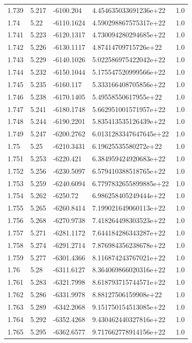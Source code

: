 \begin{tabular}{lllll}
1.739 & 5.217 & -6100.204 & 4.454635033691236e+22 & 1.0 \\
1.74 & 5.22 & -6110.1624 & 4.590298867575317e+22 & 1.0 \\
1.741 & 5.223 & -6120.1317 & 4.730094280294685e+22 & 1.0 \\
1.742 & 5.226 & -6130.1117 & 4.87414709715726e+22 & 1.0 \\
1.743 & 5.229 & -6140.1026 & 5.022586975422042e+22 & 1.0 \\
1.744 & 5.232 & -6150.1044 & 5.175547520999566e+22 & 1.0 \\
1.745 & 5.235 & -6160.117 & 5.333166408705856e+22 & 1.0 \\
1.746 & 5.238 & -6170.1405 & 5.49558550617955e+22 & 1.0 \\
1.747 & 5.241 & -6180.1748 & 5.662951001571957e+22 & 1.0 \\
1.748 & 5.244 & -6190.2201 & 5.835413535126439e+22 & 1.0 \\
1.749 & 5.247 & -6200.2762 & 6.0131283347647645e+22 & 1.0 \\
1.75 & 5.25 & -6210.3431 & 6.19625535580272e+22 & 1.0 \\
1.751 & 5.253 & -6220.421 & 6.384959424920683e+22 & 1.0 \\
1.752 & 5.256 & -6230.5097 & 6.579410388518765e+22 & 1.0 \\
1.753 & 5.259 & -6240.6094 & 6.7797832655899885e+22 & 1.0 \\
1.754 & 5.262 & -6250.72 & 6.986258405249444e+22 & 1.0 \\
1.755 & 5.265 & -6260.8414 & 7.199021649060113e+22 & 1.0 \\
1.756 & 5.268 & -6270.9738 & 7.418264498303523e+22 & 1.0 \\
1.757 & 5.271 & -6281.1172 & 7.644184286343287e+22 & 1.0 \\
1.758 & 5.274 & -6291.2714 & 7.876984356238678e+22 & 1.0 \\
1.759 & 5.277 & -6301.4366 & 8.116874243767021e+22 & 1.0 \\
1.76 & 5.28 & -6311.6127 & 8.364069866020316e+22 & 1.0 \\
1.761 & 5.283 & -6321.7998 & 8.618793715744571e+22 & 1.0 \\
1.762 & 5.286 & -6331.9978 & 8.88127506159908e+22 & 1.0 \\
1.763 & 5.289 & -6342.2068 & 9.151750154513085e+22 & 1.0 \\
1.764 & 5.292 & -6352.4268 & 9.430462440327816e+22 & 1.0 \\
1.765 & 5.295 & -6362.6577 & 9.717662778914156e+22 & 1.0 \\

\end{tabular}
